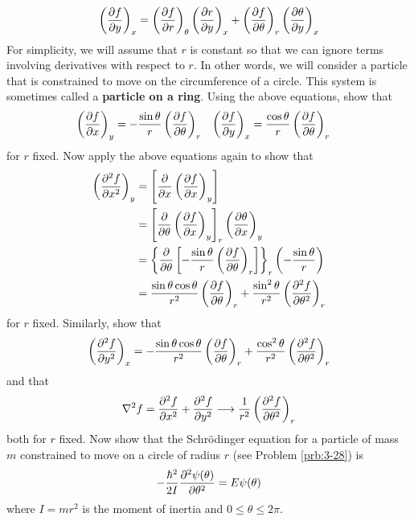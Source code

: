 \documentclass[../notes.tex]{subfiles}
\begin{document}
\begin{enumerate}[label={\textbf{5-\arabic*.}},ref={5-\arabic*}]
\begin{equation*}
        \left( \pdv{f}{y} \right)_x = \left( \pdv{f}{r} \right)_\theta\left( \pdv{r}{y} \right)_x+\left( \pdv{f}{\theta} \right)_r\left( \pdv{\theta}{y} \right)_x
    \end{equation*}
    For simplicity, we will assume that $r$ is constant so that we can ignore terms involving derivatives with respect to $r$. In other words, we will consider a particle that is constrained to move on the circumference of a circle. This system is sometimes called a \textbf{particle on a ring}. Using the above equations, show that
    \begin{align*}
        \left( \pdv{f}{x} \right)_y &= -\frac{\sin\theta}{r}\left( \pdv{f}{\theta} \right)_r&
        \left( \pdv{f}{y} \right)_x &= \frac{\cos\theta}{r}\left( \pdv{f}{\theta} \right)_r
    \end{align*}
    for $r$ fixed. Now apply the above equations again to show that
    \begin{align*}
        \left( \pdv[2]{f}{x} \right)_y &= \left[ \pdv{x}\left( \pdv{f}{x} \right)_y \right]\\
        &= \left[ \pdv{\theta}\left( \pdv{f}{x} \right)_y \right]_r\left( \pdv{\theta}{x} \right)_y\\
        &= \left\{ \pdv{\theta}\left[ -\frac{\sin\theta}{r}\left( \pdv{f}{\theta} \right)_r \right] \right\}_r\left( -\frac{\sin\theta}{r} \right)\\
        &= \frac{\sin\theta\cos\theta}{r^2}\left( \pdv{f}{\theta} \right)_r+\frac{\sin^2\theta}{r^2}\left( \pdv[2]{f}{\theta} \right)_r
    \end{align*}
    for $r$ fixed. Similarly, show that
    \begin{equation*}
        \left( \pdv[2]{f}{y} \right)_x = -\frac{\sin\theta\cos\theta}{r^2}\left( \pdv{f}{\theta} \right)_r+\frac{\cos^2\theta}{r^2}\left( \pdv[2]{f}{\theta} \right)_r
    \end{equation*}
    and that
    \begin{equation*}
        \nabla^2f = \pdv[2]{f}{x}+\pdv[2]{f}{y} \longrightarrow \frac{1}{r^2}\left( \pdv[2]{f}{\theta} \right)_r
    \end{equation*}
    both for $r$ fixed. Now show that the Schr\"{o}dinger equation for a particle of mass $m$ constrained to move on a circle of radius $r$ (see Problem \ref{prb:3-28}) is
    \begin{equation*}
        -\frac{\hbar^2}{2I}\pdv[2]{\psi(\theta)}{\theta} = E\psi(\theta)
    \end{equation*}
    where $I=mr^2$ is the moment of inertia and $0\leq\theta\leq 2\pi$.

\end{enumerate}
\end{document}
